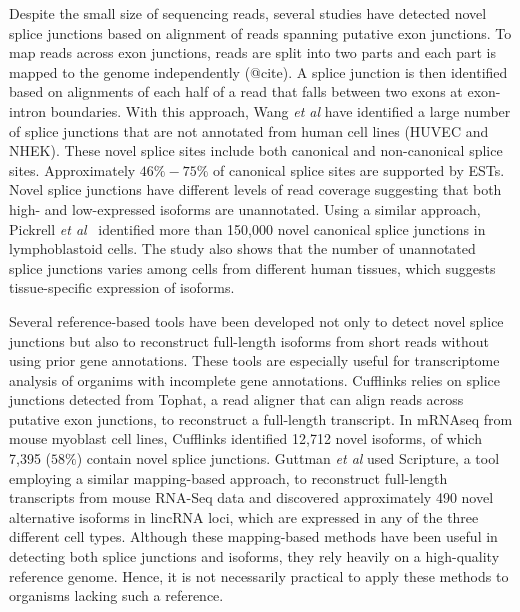 \documentclass[10pt]{article}
\begin{document}
Despite the small size of sequencing reads, several studies have
detected novel splice junctions based on alignment of reads spanning
putative exon junctions.  To map reads across exon junctions,
reads are split into two parts and each part is mapped to the genome
independently (@cite).  A splice junction is then identified based on
alignments of each half of a read that falls between two exons at
exon-intron boundaries.  With this approach, Wang \emph{et al} have
identified a large number of splice junctions that are not annotated
from human cell lines (HUVEC and NHEK)\cite{Wang:2011jq}.  These novel
splice sites include both canonical and non-canonical splice sites.
Approximately $46\%-75\%$ of canonical splice sites are supported by
ESTs.  Novel splice junctions have different levels of read coverage
suggesting that both high- and low-expressed isoforms are unannotated.
Using a similar approach, Pickrell {\em et al}~\cite{Pickrell:2010gt}
identified more than 150,000 novel canonical splice junctions in lymphoblastoid
cells.  The study also shows that the number of unannotated splice junctions
varies among cells from different human tissues, which suggests tissue-specific
expression of isoforms\cite{Pickrell:2010gt}.

Several reference-based tools have been developed not only to detect
novel splice junctions but also to reconstruct full-length isoforms
from short reads without using prior gene annotations.  These tools
are especially useful for transcriptome analysis of organims with
incomplete gene annotations.  Cufflinks\cite{Trapnell:2010kd} relies
on splice junctions detected from Tophat\cite{Trapnell:2009dp}, a read
aligner that can align reads across putative exon junctions, to
reconstruct a full-length transcript.  In mRNAseq from mouse myoblast
cell lines, Cufflinks identified 12,712 novel isoforms, of which 7,395
($58\%$) contain novel splice junctions.  Guttman {\em et al} used
Scripture, a tool employing a similar mapping-based approach, to
reconstruct full-length transcripts from mouse RNA-Seq data and
discovered approximately 490 novel alternative isoforms in lincRNA
loci, which are expressed in any of the three different cell
types\cite{Guttman:2010io}.  Although these mapping-based methods have
been useful in detecting both splice junctions and isoforms, they rely
heavily on a high-quality reference genome.  Hence, it is not
necessarily practical to apply these methods to organisms lacking such
a reference.
\end{document}
